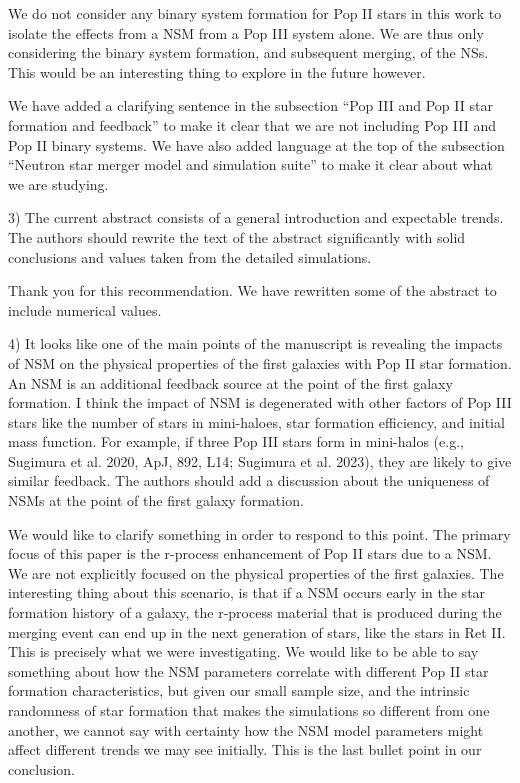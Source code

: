 \documentclass[11pt]{article}
\begin{document}
We do not consider any binary system formation for Pop II stars in this work to isolate the effects from a NSM from a Pop III system alone. We are thus only considering the binary system formation, and subsequent merging, of the NSs. This would be an interesting thing to explore in the future however.

We have added a clarifying sentence in the subsection ``Pop III and Pop II star formation and feedback'' to make it clear that we are not including Pop III and Pop II binary systems. We have also added language at the top of the subsection ``Neutron star merger model and simulation suite'' to make it clear about what we are studying.

\begin{tcolorbox}[colback={lightgray}]
    3)      The current abstract consists of a general introduction and expectable trends. The authors should rewrite the text of the abstract significantly with solid conclusions and values taken from the detailed simulations.
\end{tcolorbox}

Thank you for this recommendation. We have rewritten some of the abstract to include numerical values. 

\begin{tcolorbox}[colback={lightgray}]
    4)      It looks like one of the main points of the manuscript is revealing the impacts of NSM on the physical properties of the first galaxies with Pop II star formation. An NSM is an additional feedback source at the point of the first galaxy formation. I think the impact of NSM is degenerated with other factors of Pop III stars like the number of stars in mini-haloes, star formation efficiency, and initial mass function. For example, if three Pop III stars form in mini-halos (e.g., Sugimura et al. 2020, ApJ, 892, L14; Sugimura et al. 2023), they are likely to give similar feedback. The authors should add a discussion about the uniqueness of NSMs at the point of the first galaxy formation.
\end{tcolorbox}

We would like to clarify something in order to respond to this point. The primary focus of this paper is the r-process enhancement of Pop II stars due to a NSM. We are not explicitly focused on the physical properties of the first galaxies. The interesting thing about this scenario, is that if a NSM occurs early in the star formation history of a galaxy, the r-process material that is produced during the merging event can end up in the next generation of stars, like the stars in Ret II. This is precisely what we were investigating. We would like to be able to say something about how the NSM parameters correlate with different Pop II star formation characteristics, but given our small sample size, and the intrinsic randomness of star formation that makes the simulations so different from one another, we cannot say with certainty how the NSM model parameters might affect different trends we may see initially. This is the last bullet point in our conclusion. 
\end{document}
